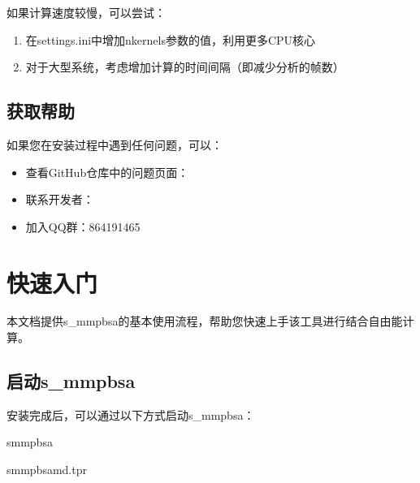 \documentclass[letterpaper,10pt,english]{sphinxmanual}
\begin{document}
\sphinxAtStartPar
如果计算速度较慢，可以尝试：
\begin{enumerate}
%
\item {} 
\sphinxAtStartPar
在settings.ini中增加nkernels参数的值，利用更多CPU核心

\item {} 
\sphinxAtStartPar
对于大型系统，考虑增加计算的时间间隔（即减少分析的帧数）

\end{enumerate}


\section{获取帮助}
\label{\detokenize{installation:id17}}
\sphinxAtStartPar
如果您在安装过程中遇到任何问题，可以：
\begin{itemize}
\item {} 
\sphinxAtStartPar
查看GitHub仓库中的问题页面：

\item {} 
\sphinxAtStartPar
联系开发者：

\item {} 
\sphinxAtStartPar
加入QQ群：864191465

\end{itemize}

\sphinxstepscope


\chapter{快速入门}
\label{\detokenize{quick_start:id1}}\label{\detokenize{quick_start::doc}}
\sphinxAtStartPar
本文档提供s\_mmpbsa的基本使用流程，帮助您快速上手该工具进行结合自由能计算。


\section{启动s\_mmpbsa}
\label{\detokenize{quick_start:s-mmpbsa}}
\sphinxAtStartPar
安装完成后，可以通过以下方式启动s\_mmpbsa：

\begin{sphinxVerbatim}[commandchars=\\\{\}]
s\PYGZus{}mmpbsa

s\PYGZus{}mmpbsamd.tpr
\end{sphinxVerbatim}
\end{document}
